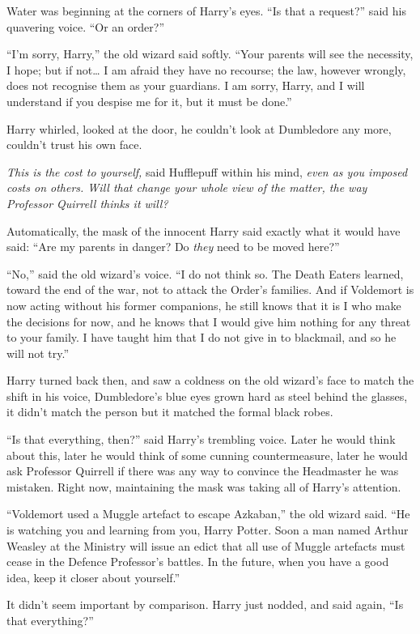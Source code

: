 Water was beginning at the corners of Harry's eyes. ``Is that a
request?'' said his quavering voice. ``Or an order?''

``I'm sorry, Harry,'' the old wizard said softly. ``Your parents will
see the necessity, I hope; but if not\ldots{} I am afraid they have no
recourse; the law, however wrongly, does not recognise them as your
guardians. I am sorry, Harry, and I will understand if you despise me
for it, but it must be done.''

Harry whirled, looked at the door, he couldn't look at Dumbledore any
more, couldn't trust his own face.

\emph{This is the cost to yourself,} said Hufflepuff within his mind,
\emph{even as you imposed costs on others. Will that change your whole
view of the matter, the way Professor Quirrell thinks it will?}

Automatically, the mask of the innocent Harry said exactly what it would
have said: ``Are my parents in danger? Do \emph{they} need to be moved
here?''

``No,'' said the old wizard's voice. ``I do not think so. The Death
Eaters learned, toward the end of the war, not to attack the Order's
families. And if Voldemort is now acting without his former companions,
he still knows that it is I who make the decisions for now, and he knows
that I would give him nothing for any threat to your family. I have
taught him that I do not give in to blackmail, and so he will not try.''

Harry turned back then, and saw a coldness on the old wizard's face to
match the shift in his voice, Dumbledore's blue eyes grown hard as steel
behind the glasses, it didn't match the person but it matched the formal
black robes.

``Is that everything, then?'' said Harry's trembling voice. Later he
would think about this, later he would think of some cunning
countermeasure, later he would ask Professor Quirrell if there was any
way to convince the Headmaster he was mistaken. Right now, maintaining
the mask was taking all of Harry's attention.

``Voldemort used a Muggle artefact to escape Azkaban,'' the old wizard
said. ``He is watching you and learning from you, Harry Potter. Soon a
man named Arthur Weasley at the Ministry will issue an edict that all
use of Muggle artefacts must cease in the Defence Professor's battles.
In the future, when you have a good idea, keep it closer about
yourself.''

It didn't seem important by comparison. Harry just nodded, and said
again, ``Is that everything?''

